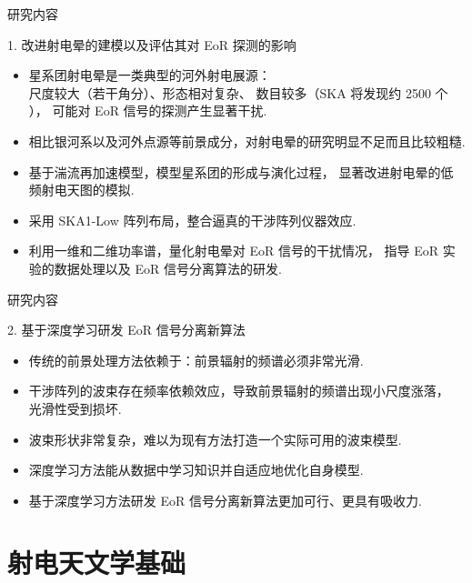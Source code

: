 \documentclass{beamer}
\begin{document}
\begin{frame}{研究内容}
  \begin{alertblock}{1. 改进射电晕的建模以及评估其对 EoR 探测的影响}
    \begin{itemize}
      \item 星系团射电晕是一类典型的河外射电展源：\\
        尺度较大（若干角分）、形态相对复杂、
        数目较多（SKA 将发现约 2500 个 \cite{cassano2015}），
        可能对 EoR 信号的探测产生显著干扰.
      \item 相比银河系以及河外点源等前景成分，对射电晕的研究明显不足而且比较粗糙.
      \item 基于\alert{湍流再加速模型}，模型星系团的形成与演化过程，
        显著改进射电晕的低频射电天图的模拟.
      \item 采用 \alert{SKA1-Low 阵列布局}，整合逼真的干涉阵列仪器效应.
      \item 利用一维和二维功率谱，量化射电晕对 EoR 信号的干扰情况，
        指导 EoR 实验的数据处理以及 EoR 信号分离算法的研发.
    \end{itemize}
  \end{alertblock}
\end{frame}

\begin{frame}{研究内容}
  \begin{alertblock}{2. 基于深度学习研发 EoR 信号分离新算法}
    \begin{itemize}
      \item 传统的前景处理方法依赖于：前景辐射的频谱必须非常光滑.
      \item 干涉阵列的波束存在频率依赖效应，导致前景辐射的频谱出现小尺度涨落，
        光滑性受到损坏.
      \item 波束形状非常复杂，难以为现有方法打造一个实际可用的波束模型.
      \item 深度学习方法能从数据中学习知识并自适应地优化自身模型.
      \item 基于深度学习方法研发 EoR 信号分离新算法更加可行、更具有吸收力.
    \end{itemize}
  \end{alertblock}
\end{frame}


\section{射电天文学基础}
\end{document}
